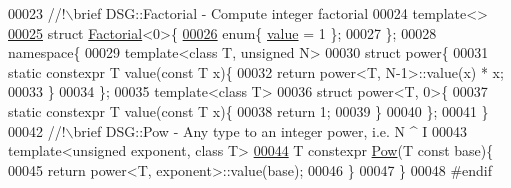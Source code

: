 \begin{DoxyCode}
00023 \textcolor{comment}{    //!\(\backslash\)brief DSG::Factorial - Compute integer factorial}
00024 \textcolor{comment}{}    \textcolor{keyword}{template}<>
\hypertarget{_d_s_g_math_8h_source_l00025}{}\hyperlink{struct_d_s_g_1_1_factorial_3_010_01_4}{00025}     \textcolor{keyword}{struct }\hyperlink{struct_d_s_g_1_1_factorial}{Factorial}<0>\{
\hypertarget{_d_s_g_math_8h_source_l00026}{}\hyperlink{struct_d_s_g_1_1_factorial_3_010_01_4_a6bfe1b9c1bfc0bdeaceb03842acb1927abba93a0ae84b21f3c62dd8baa14039eb}{00026}         \textcolor{keyword}{enum}\{ \hyperlink{struct_d_s_g_1_1_factorial_a2443a477420ba8fc5494b186a58dcaccaebc078d57d6fc1fbd5953d284c9cde04}{value} = 1 \};
00027     \};
00028     \textcolor{keyword}{namespace}\{
00029         \textcolor{keyword}{template}<\textcolor{keyword}{class} T, \textcolor{keywordtype}{unsigned} N>
00030         \textcolor{keyword}{struct }power\{
00031             \textcolor{keyword}{static} constexpr T value(\textcolor{keyword}{const} T x)\{
00032                 \textcolor{keywordflow}{return} power<T, N-1>::value(x) * x;
00033             \}
00034         \};
00035         \textcolor{keyword}{template}<\textcolor{keyword}{class} T>
00036         \textcolor{keyword}{struct }power<T, 0>\{
00037             \textcolor{keyword}{static} constexpr T value(\textcolor{keyword}{const} T x)\{
00038                 \textcolor{keywordflow}{return} 1;
00039             \}
00040         \};
00041     \}\textcolor{comment}{}
00042 \textcolor{comment}{    //!\(\backslash\)brief DSG::Pow - Any type to an integer power, i.e. N ^ I }
00043 \textcolor{comment}{}    \textcolor{keyword}{template}<\textcolor{keywordtype}{unsigned} exponent, \textcolor{keyword}{class} T>
\hypertarget{_d_s_g_math_8h_source_l00044}{}\hyperlink{namespace_d_s_g_a34372a42acb2d6d62d18effc379857bc}{00044}     T constexpr \hyperlink{namespace_d_s_g_a34372a42acb2d6d62d18effc379857bc}{Pow}(T \textcolor{keyword}{const} base)\{
00045         \textcolor{keywordflow}{return} power<T, exponent>::value(base);
00046     \}
00047 \}
00048 \textcolor{preprocessor}{#endif}
\end{DoxyCode}
